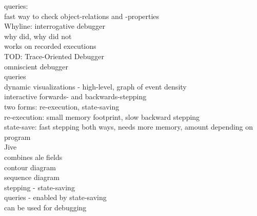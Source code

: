 queries:\\
	fast way to check object-relations and -properties\\
	Whyline: interrogative debugger\\
	why did, why did not\\
	works on recorded executions\\

TOD: Trace-Oriented Debugger\\
	omniscient debugger\\
	queries\\
	dynamic visualizations - high-level, graph of event density\\

interactive forwards- and backwards-stepping\\
	two forms: re-execution, state-saving\\
	re-execution: small memory footprint,  slow backward stepping\\
	state-save: fast stepping both ways, needs more memory, amount depending on program\\

Jive\\
	combines ale fields\\
	contour diagram\\
	sequence diagram\\
	stepping - state-saving\\
	queries - enabled by state-saving\\
	can be used for debugging\\




